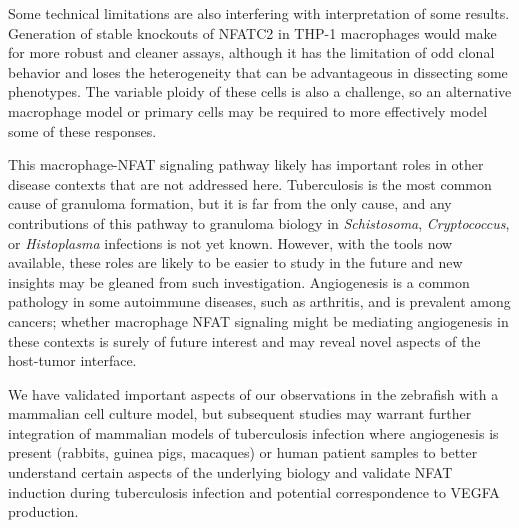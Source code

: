 Some technical limitations are also interfering with interpretation of some results. Generation of stable knockouts of NFATC2 in THP-1 macrophages would make for more robust and cleaner assays, although it has the limitation of odd clonal behavior and loses the heterogeneity that can be advantageous in dissecting some phenotypes. The variable ploidy of these cells is also a challenge, so an alternative macrophage model or primary cells may be required to more effectively model some of these responses.

This macrophage-NFAT signaling pathway likely has important roles in other disease contexts that are not addressed here. Tuberculosis is the most common cause of granuloma formation, but it is far from the only cause, and any contributions of this pathway to granuloma biology in \textit{Schistosoma}, \textit{Cryptococcus}, or \textit{Histoplasma} infections is not yet known. However, with the tools now available, these roles are likely to be easier to study in the future and new insights may be gleaned from such investigation. Angiogenesis is a common pathology in some autoimmune diseases, such as arthritis, and is prevalent among cancers; whether macrophage NFAT signaling might be mediating angiogenesis in these contexts is surely of future interest and may reveal novel aspects of the host-tumor interface.

We have validated important aspects of our observations in the zebrafish with a mammalian cell culture model, but subsequent studies may warrant further integration of mammalian models of tuberculosis infection where angiogenesis is present (rabbits, guinea pigs, macaques) or human patient samples to better understand certain aspects of the underlying biology and validate NFAT induction during tuberculosis infection and potential correspondence to VEGFA production.

